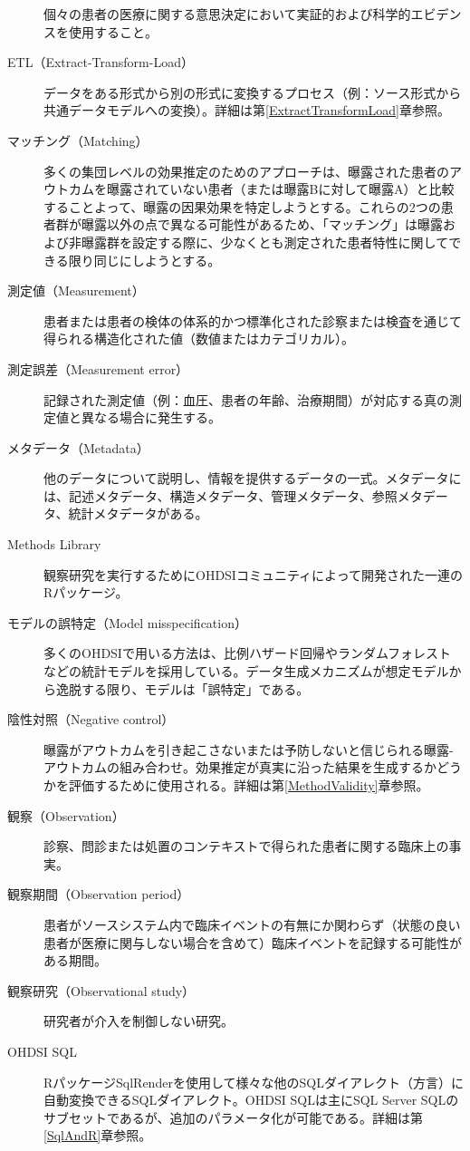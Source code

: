 \documentclass[
  11pt]{book}
\theoremstyle{definition}
\theoremstyle{definition}
\theoremstyle{definition}
\theoremstyle{definition}
\theoremstyle{remark}
\begin{document}
\begin{description}
個々の患者の医療に関する意思決定において実証的および科学的エビデンスを使用すること。
\item[ETL（Extract-Transform-Load）]
データをある形式から別の形式に変換するプロセス（例：ソース形式から共通データモデルへの変換）。詳細は第\ref{ExtractTransformLoad}章参照。
\item[マッチング（Matching）]
多くの集団レベルの効果推定のためのアプローチは、曝露された患者のアウトカムを曝露されていない患者（または曝露Bに対して曝露A）と比較することよって、曝露の因果効果を特定しようとする。これらの2つの患者群が曝露以外の点で異なる可能性があるため、「マッチング」は曝露および非曝露群を設定する際に、少なくとも測定された患者特性に関してできる限り同じにしようとする。
\item[測定値（Measurement）]
患者または患者の検体の体系的かつ標準化された診察または検査を通じて得られる構造化された値（数値またはカテゴリカル）。
\item[測定誤差（Measurement error）]
記録された測定値（例：血圧、患者の年齢、治療期間）が対応する真の測定値と異なる場合に発生する。
\item[メタデータ（Metadata）]
他のデータについて説明し、情報を提供するデータの一式。メタデータには、記述メタデータ、構造メタデータ、管理メタデータ、参照メタデータ、統計メタデータがある。
\item[Methods Library]
観察研究を実行するためにOHDSIコミュニティによって開発された一連のRパッケージ。
\item[モデルの誤特定（Model misspecification）]
多くのOHDSIで用いる方法は、比例ハザード回帰やランダムフォレストなどの統計モデルを採用している。データ生成メカニズムが想定モデルから逸脱する限り、モデルは「誤特定」である。
\item[陰性対照（Negative control）]
曝露がアウトカムを引き起こさないまたは予防しないと信じられる曝露-アウトカムの組み合わせ。効果推定が真実に沿った結果を生成するかどうかを評価するために使用される。詳細は第\ref{MethodValidity}章参照。
\item[観察（Observation）]
診察、問診または処置のコンテキストで得られた患者に関する臨床上の事実。
\item[観察期間（Observation period）]
患者がソースシステム内で臨床イベントの有無にか関わらず（状態の良い患者が医療に関与しない場合を含めて）臨床イベントを記録する可能性がある期間。
\item[観察研究（Observational study）]
研究者が介入を制御しない研究。
\item[OHDSI SQL]
RパッケージSqlRenderを使用して様々な他のSQLダイアレクト（方言）に自動変換できるSQLダイアレクト。OHDSI SQLは主にSQL Server SQLのサブセットであるが、追加のパラメータ化が可能である。詳細は第\ref{SqlAndR}章参照。

\end{description}
\end{document}

